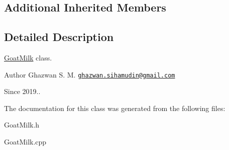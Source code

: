 \subsection*{Additional Inherited Members}


\subsection{Detailed Description}
\hyperlink{classGoatMilk}{Goat\+Milk} class.

\begin{DoxyAuthor}{Author}
Ghazwan S. M. \href{mailto:ghazwan.sihamudin@gmail.com}{\tt ghazwan.\+sihamudin@gmail.\+com} 
\end{DoxyAuthor}
\begin{DoxySince}{Since}
2019.. 
\end{DoxySince}


The documentation for this class was generated from the following files\+:\begin{DoxyCompactItemize}
\item 
Goat\+Milk.\+h\item 
Goat\+Milk.\+cpp\end{DoxyCompactItemize}
